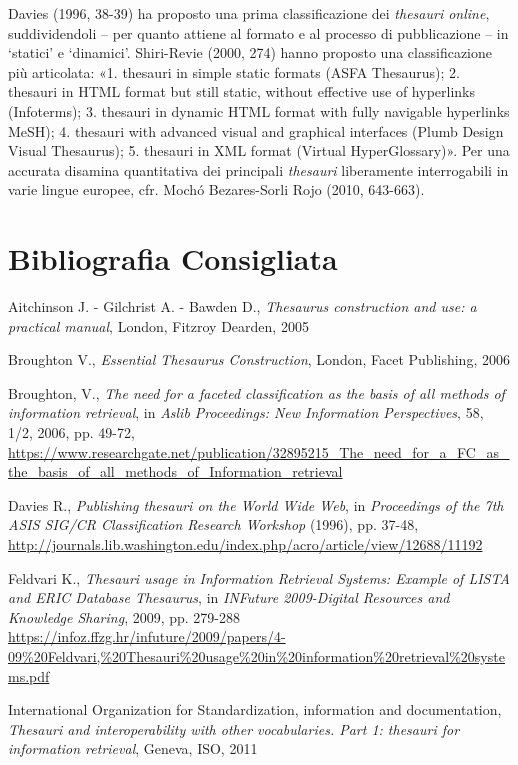 {Davies (1996, 38-39) ha proposto una prima classificazione dei
\emph{thesauri online}, suddividendoli -- per quanto attiene al formato
e al processo di pubblicazione -- in `statici' e `dinamici'. Shiri-Revie
(2000, 274) hanno proposto una classificazione più articolata: «1.
thesauri in simple static formats (ASFA Thesaurus); 2. thesauri in HTML
format but still static, without effective use of hyperlinks
(Infoterms); 3. thesauri in dynamic HTML format with fully navigable
hyperlinks MeSH); 4. thesauri with advanced visual and graphical
interfaces (Plumb Design Visual Thesaurus); 5. thesauri in XML format
(Virtual HyperGlossary)». Per una accurata disamina quantitativa dei
principali \emph{thesauri} liberamente interrogabili in varie lingue
europee, cfr. Mochó Bezares-Sorli Rojo (2010, 643-663).

\section*{Bibliografia Consigliata}
{\parindent0pt 
Aitchinson J. - Gilchrist A. - Bawden D., \emph{Thesaurus construction
and use: a practical manual}, London, Fitzroy Dearden, 2005

Broughton V., \emph{Essential Thesaurus Construction}, London, Facet
Publishing, 2006

Broughton, V., \emph{The need for a faceted classification as the basis
of all methods of information retrieval}, in \emph{Aslib Proceedings:
New Information Perspectives}, 58, 1/2, 2006, pp. 49-72,
\url{https://www.researchgate.net/publication/32895215_The_need_for_a_FC_as_the_basis_of_all_methods_of_Information_retrieval}

Davies R., \emph{Publishing thesauri on the World Wide Web}, in
\emph{Proceedings of the 7th ASIS SIG/CR Classification Research
Workshop} (1996), pp. 37-48,
\url{http://journals.lib.washington.edu/index.php/acro/article/view/12688/11192}

Feldvari K., \emph{Thesauri usage in Information Retrieval Systems:
Example of LISTA and ERIC Database Thesaurus}, in \emph{INFuture
2009-Digital Resources and Knowledge Sharing}, 2009, pp. 279-288
\url{https://infoz.ffzg.hr/infuture/2009/papers/4-09\%20Feldvari,\%20Thesauri\%20usage\%20in\%20information\%20retrieval\%20systems.pdf}

International Organization for Standardization, information and
documentation, \emph{Thesauri and interoperability with other
vocabularies. Part 1: thesauri for information retrieval}, Geneva, ISO,
2011

}}
